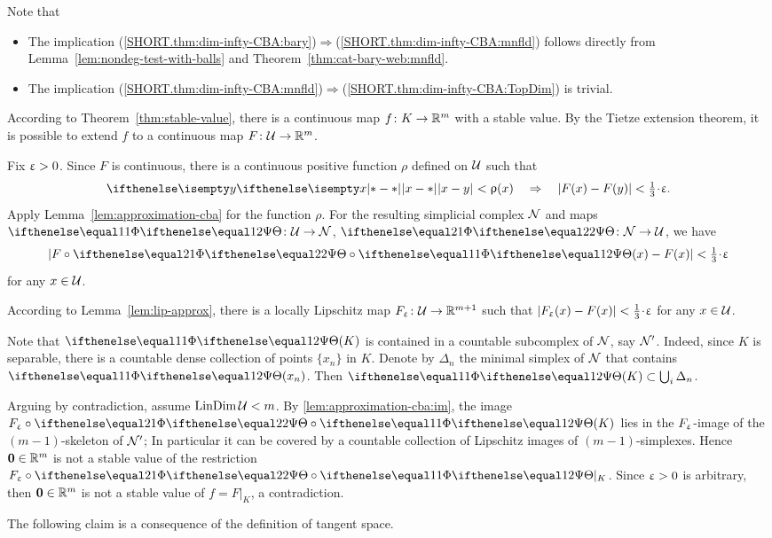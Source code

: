 Note that
\begin{itemize}
\item The implication (\ref{SHORT.thm:dim-infty-CBA:bary})$\Rightarrow$(\ref{SHORT.thm:dim-infty-CBA:mnfld})
follows directly from Lemma~\ref{lem:nondeg-test-with-balls}
and Theorem~\ref{thm:cat-bary-web:mnfld}.
\item The implication 
(\ref{SHORT.thm:dim-infty-CBA:mnfld})$\Rightarrow$(\ref{SHORT.thm:dim-infty-CBA:TopDim}) 
is trivial.
\end{itemize}
 
According to Theorem~\ref{thm:stable-value}, 
there is a continuous map $f\:K\to \RR^{m}$ with a stable value.
By the Tietze extension theorem, it is possible to extend $f$ 
to a continuous map $F\:\spc{U}\to \RR^{m}$.

Fix $\upvarepsilon>0$.
Since $F$ is continuous, there is a continuous positive function $\rho$ defined on $\mathcal{U}$ such that 
\[\dist{x}{y}{}<\rho(x)
\quad\Rightarrow\quad
|F(x)- F(y)|<\tfrac13\cdot\eps.\]
Apply Lemma~\ref{lem:approximation-cba} for the function $\rho$.
For the resulting simplicial complex $\mathcal{N}$ 
 and maps $\map\:\spc{U}\to \spc{N}$, $\map[2]\:\spc{N}\to \spc{U}$, we have
\[|F\circ \map[2]\circ\map(x)-F(x)|<\tfrac13\cdot\eps\] 
for any $x\in \spc{U}$.

According to Lemma~\ref{lem:lip-approx},
there is a locally Lipschitz map $F_\eps\:\spc{U}\to \RR^{m+1}$ 
such that $|F_\eps(x)-F(x)|<\tfrac13\cdot\eps$ for any $x\in \spc{U}$.

Note that
$\map(K)$ is contained in a countable subcomplex of $\mathcal{N}$, say $\mathcal{N}'$.
Indeed, since $K$ is separable, there is a countable dense collection of points $\{x_n\}$ in $K$.
Denote by $\Delta_n$ the minimal simplex of $\mathcal{N}$ that contains $\map(x_n)$.
Then $\map(K)\subset\bigcup_i\Delta_n$.

Arguing by contradiction,
assume $\mathop{\rm LinDim}\nolimits\mathcal{U}<m$.
By \ref{lem:approximation-cba:im},
the image $F_\eps\circ\map[2]\circ\map(K)$ lies in the $F_\upvarepsilon$-image of the $(m-1)$-skeleton of $\mathcal{N}'$;
In particular it can be covered 
by a  countable collection of Lipschitz images of $(m-1)$-simplexes.
Hence
$\bm{0}\in \RR^m$ is not a stable value of the restriction $F_\eps\circ\map[2]\circ\map|_K$.
Since $\upvarepsilon>0$ is arbitrary, 
then $\bm{0}\in \RR^m$ is not a stable value of $f=F|_K$, a contradiction.

The following claim is a consequence of the definition of tangent space.

